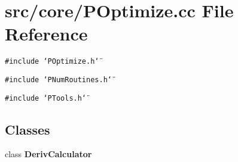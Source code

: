 \section{src/core/POptimize.cc File Reference}
\label{POptimize_8cc}


{\tt \#include \char`\"{}POptimize.h\char`\"{}}\par
{\tt \#include \char`\"{}PNum\-Routines.h\char`\"{}}\par
{\tt \#include \char`\"{}PTools.h\char`\"{}}\par
\subsection*{Classes}
\begin{CompactItemize}
\item 
class {\bf Deriv\-Calculator}
\end{CompactItemize}
